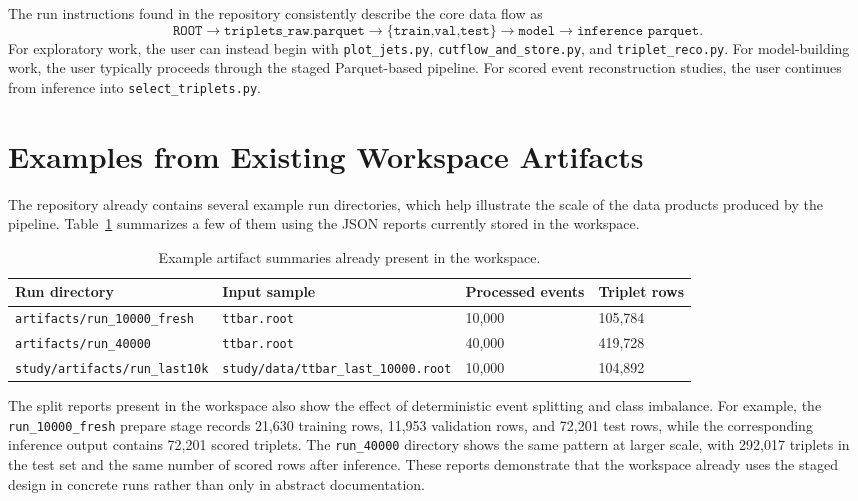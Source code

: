 \documentclass[11pt]{article}
\begin{document}
The run instructions found in the repository consistently describe the core data flow as
\[
\texttt{ROOT} \rightarrow \texttt{triplets\_raw.parquet} \rightarrow
\{\texttt{train,val,test}\} \rightarrow \texttt{model} \rightarrow \texttt{inference parquet}.
\]
For exploratory work, the user can instead begin with \texttt{plot\_jets.py}, \texttt{cutflow\_and\_store.py}, and \texttt{triplet\_reco.py}. For model-building work, the user typically proceeds through the staged Parquet-based pipeline. For scored event reconstruction studies, the user continues from inference into \texttt{select\_triplets.py}.

\section{Examples from Existing Workspace Artifacts}

The repository already contains several example run directories, which help illustrate the scale of the data products produced by the pipeline. Table~\ref{tab:workspace-runs} summarizes a few of them using the JSON reports currently stored in the workspace.

\begin{table}[htbp]
  \centering
  \caption{Example artifact summaries already present in the workspace.}
  \label{tab:workspace-runs}
  \begin{tabular}{@{}llll@{}}
    \toprule
    Run directory & Input sample & Processed events & Triplet rows \\
    \midrule
    \texttt{artifacts/run\_10000\_fresh} & \texttt{ttbar.root} & 10{,}000 & 105{,}784 \\
    \texttt{artifacts/run\_40000} & \texttt{ttbar.root} & 40{,}000 & 419{,}728 \\
    \texttt{study/artifacts/run\_last10k} & \texttt{study/data/ttbar\_last\_10000.root} & 10{,}000 & 104{,}892 \\
    \bottomrule
  \end{tabular}
\end{table}

The split reports present in the workspace also show the effect of deterministic event splitting and class imbalance. For example, the \texttt{run\_10000\_fresh} prepare stage records 21{,}630 training rows, 11{,}953 validation rows, and 72{,}201 test rows, while the corresponding inference output contains 72{,}201 scored triplets. The \texttt{run\_40000} directory shows the same pattern at larger scale, with 292{,}017 triplets in the test set and the same number of scored rows after inference. These reports demonstrate that the workspace already uses the staged design in concrete runs rather than only in abstract documentation.
\end{document}

